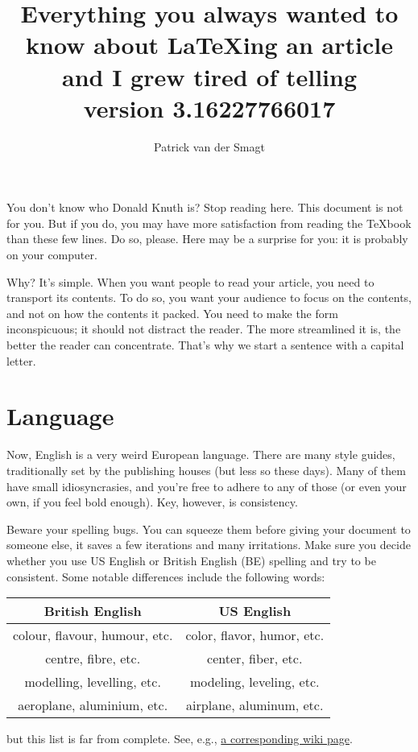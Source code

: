 \documentclass{article}
\title{Everything you always wanted to know about \LaTeX ing an article 
and I grew tired of telling\\[1ex]
\footnotesize{version 3.16227766017}}
\author{Patrick van der Smagt}
\begin{document}
\maketitle

You don't know who Donald Knuth is?  Stop reading here.  This document is 
not for you.  But if you do, you may have more satisfaction from reading 
the \TeX book than these few lines.   Do so, please. Here may be a surprise for you: it is probably on your computer.

Why?
It's simple.
When you want people to read your article, you need to transport its contents. 
To do so, you want your audience to focus on the contents, and not on how the contents it packed.
You need to make the form inconspicuous; it should not distract the reader.
The more streamlined it is, the better the reader can concentrate.
That's why we start a sentence with a capital letter.



\section{Language}
Now, English is a very weird European language.
There are many style guides, traditionally set by the publishing houses (but less so these days).
Many of them have small idiosyncrasies, and you're free to adhere to any of those (or even your own, if you feel bold enough).
Key, however, is consistency.

Beware your spelling bugs.  You can squeeze them before giving your document to someone else, it saves a few iterations and many irritations.  Make sure you decide whether you use US English or British English (BE) spelling and try to be consistent.
Some notable differences include the following words:
\begin{center}\begin{tabular}{c|c}
British English & US English \\\hline
colour, flavour, humour, etc.	& color, flavor, humor, etc.\\
centre, fibre, etc.	& center, fiber, etc.\\
modelling, levelling, etc.		& modeling, leveling, etc.\\
aeroplane, aluminium, etc.			& airplane, aluminum, etc.
\end{tabular}\end{center}
but this list is far from complete.  See, e.g., \href{http://en.wikipedia.org/wiki/American_and_British_English_spelling_differences}{a corresponding wiki page}.
\end{document}
